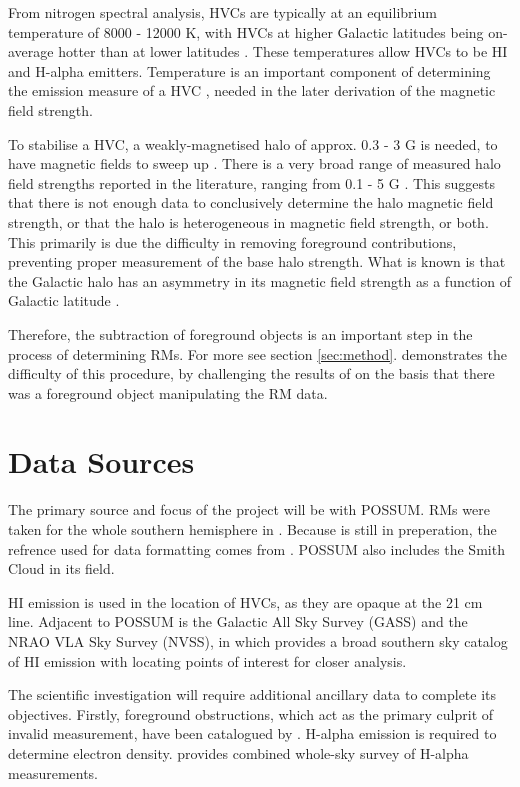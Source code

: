 From nitrogen spectral analysis, HVCs are typically at an equilibrium temperature of 8000 - 12000 K, with HVCs at higher Galactic latitudes being on-average hotter than at lower latitudes \cite{ID48, ID49}. These temperatures allow HVCs to be HI and H-alpha emitters. Temperature is an important component of determining the emission measure of a HVC \cite{ID5, ID26, ID30}, needed in the later derivation of the magnetic field strength.

To stabilise a HVC, a weakly-magnetised halo of approx. 0.3 - 3 {\textmu}G is needed, to have magnetic fields to sweep up \cite{ID13}. There is a very broad range of measured halo field strengths reported in the literature, ranging from 0.1 - 5 {\textmu}G \cite{ID4, ID16, ID21, ID30, ID37, ID42}. This suggests that there is not enough data to conclusively determine the halo magnetic field strength, or that the halo is heterogeneous in magnetic field strength, or both. This primarily is due the difficulty in removing foreground contributions, preventing proper measurement of the base halo strength. What is known is that the Galactic halo has an asymmetry in its magnetic field strength as a function of Galactic latitude \cite{ID16, ID30, ID21}.

Therefore, the subtraction of foreground objects is an important step in the process of determining RMs. For more see section \ref{sec:method}. \citep{ID36} demonstrates the difficulty of this procedure, by challenging the results of \citep{ID2} on the basis that there was a foreground object manipulating the RM data.

\section{Data Sources}
\label{sec:sources}

The primary source and focus of the project will be with POSSUM. RMs were taken for the whole southern hemisphere in \citep{ID52}. Because \citep{ID52} is still in preperation, the refrence used for data formatting comes from \citep{ID1}. POSSUM also includes the Smith Cloud in its field.

HI emission is used in the location of HVCs, as they are opaque at the 21 cm line. Adjacent to POSSUM is the Galactic All Sky Survey (GASS) and the NRAO VLA Sky Survey (NVSS), in which \citep{ID3, ID6} provides a broad southern sky catalog of HI emission with \citep{ID3} locating points of interest for closer analysis.

The scientific investigation will require additional ancillary data to complete its objectives. Firstly, foreground obstructions, which act as the primary culprit of invalid measurement, have been catalogued by \citep{ID44, ID45}. H-alpha emission is required to determine electron density. \citep{ID43} provides combined whole-sky survey of H-alpha measurements.

